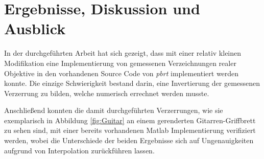 \newpage
\section{Ergebnisse, Diskussion und Ausblick}

In der durchgeführten Arbeit hat sich gezeigt, dass mit einer relativ kleinen Modifikation eine Implementierung von gemessenen Verzeichnungen realer Objektive in den vorhandenen Source Code von \textit{pbrt} implementiert werden konnte. Die einzige Schwierigkeit bestand darin, eine Invertierung der gemessenen Verzerrung zu bilden, welche numerisch errechnet werden musste. 

Anschließend konnten die damit durchgeführten Verzerrungen, wie sie exemplarisch in Abbildung \ref{fig:Guitar} an einem gerenderten Gitarren-Griffbrett zu sehen sind, mit einer bereits vorhandenen Matlab Implementierung verifiziert werden, wobei die Unterschiede der beiden Ergebnisse sich auf Ungenauigkeiten aufgrund von Interpolation zurückführen lassen.


